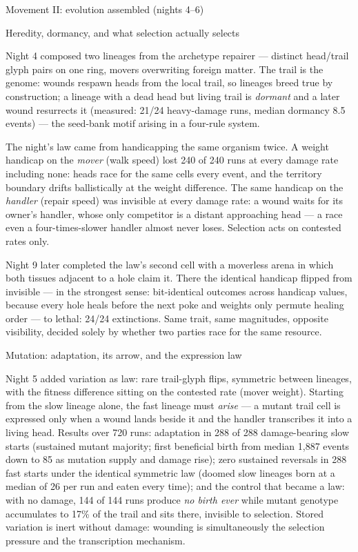 \sec Movement II: evolution assembled (nights 4--6)

\secc Heredity, dormancy, and what selection actually selects

Night 4 composed two lineages from the archetype repairer ---
distinct head/trail glyph pairs on one ring, movers overwriting
foreign matter. The trail is the genome: wounds respawn heads from
the local trail, so lineages breed true by construction; a lineage
with a dead head but living trail is {\it dormant} and a later
wound resurrects it (measured: 21/24 heavy-damage runs, median
dormancy 8.5 events) --- the seed-bank motif arising in a four-rule
system.

The night's law came from handicapping the same organism twice.
A weight handicap on the {\it mover} (walk speed) lost 240 of 240
runs at every damage rate including none: heads race for the same
cells every event, and the territory boundary drifts ballistically
at the weight difference. The same handicap on the {\it handler}
(repair speed) was invisible at every damage rate: a wound waits
for its owner's handler, whose only competitor is a distant
approaching head --- a race even a four-times-slower handler almost
never loses.  Selection acts on contested
rates only.

Night 9 later completed the law's second cell with a moverless
arena in which both tissues adjacent to a hole claim it. There the
identical handicap flipped from invisible --- in the strongest
sense: bit-identical outcomes across handicap values, because every
hole heals before the next poke and weights only permute healing
order --- to lethal: 24/24 extinctions. Same trait, same magnitudes,
opposite visibility, decided solely by whether two parties race for
the same resource.

\secc Mutation: adaptation, its arrow, and the expression law

Night 5 added variation as law: rare trail-glyph flips, symmetric
between lineages, with the fitness difference sitting on the
contested rate (mover weight). Starting from the slow lineage
alone, the fast lineage must {\it arise} --- a mutant trail cell is
expressed only when a wound lands beside it and the handler
transcribes it into a living head. Results over 720 runs:
adaptation in 288 of 288 damage-bearing slow starts (sustained
mutant majority; first beneficial birth from median 1{,}887 events
down to 85 as mutation supply and damage rise); zero sustained
reversals in 288 fast starts under the identical symmetric law
(doomed slow lineages born at a median of 26 per run and eaten every
time); and the control that became a law: with no damage, 144 of
144 runs produce {\it no birth ever} while mutant genotype
accumulates to 17\% of the trail and sits there, invisible to
selection.  Stored variation is inert without damage:
wounding is simultaneously the selection pressure and the
transcription mechanism.

